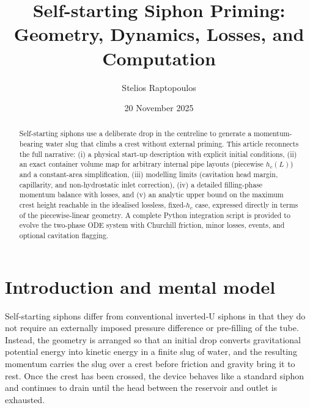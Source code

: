 \documentclass[11pt]{article}
\title{Self-starting Siphon Priming: Geometry, Dynamics, Losses, and Computation}
\author{Stelios Raptopoulos}
\date{20 November 2025}
\begin{document}
\maketitle

\begin{abstract}
Self-starting siphons use a deliberate drop in the centreline to generate a momentum-bearing water slug that climbs a crest without external priming. This article reconnects the full narrative: (i) a physical start-up description with explicit initial conditions, (ii) an exact container volume map for arbitrary internal pipe layouts (piecewise $h_c(L)$) and a constant-area simplification, (iii) modelling limits (cavitation head margin, capillarity, and non-hydrostatic inlet correction), (iv) a detailed filling-phase momentum balance with losses, and (v) an analytic upper bound on the maximum crest height reachable in the idealised lossless, fixed-$h_c$ case, expressed directly in terms of the piecewise-linear geometry. A complete Python integration script is provided to evolve the two-phase ODE system with Churchill friction, minor losses, events, and optional cavitation flagging.
\end{abstract}

\tableofcontents

\bigskip

\section{Introduction and mental model}

Self-starting siphons differ from conventional inverted-U siphons in that they do not require
an externally imposed pressure difference or pre-filling of the tube. Instead, the geometry is
arranged so that an initial drop converts gravitational potential energy into kinetic energy in
a finite slug of water, and the resulting momentum carries the slug over a crest before friction
and gravity bring it to rest. Once the crest has been crossed, the device behaves like a standard
siphon and continues to drain until the head between the reservoir and outlet is exhausted.
\end{document}
